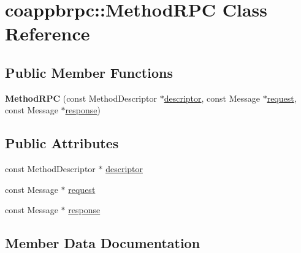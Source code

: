 \hypertarget{classcoappbrpc_1_1MethodRPC}{}\section{coappbrpc\+:\+:Method\+R\+PC Class Reference}
\label{classcoappbrpc_1_1MethodRPC}
\subsection*{Public Member Functions}
\begin{DoxyCompactItemize}
\item 
\mbox{\label{classcoappbrpc_1_1MethodRPC_a0db09113d43fcfef728b4dd261cd564a}} 
{\bfseries Method\+R\+PC} (const Method\+Descriptor $\ast$\hyperlink{classcoappbrpc_1_1MethodRPC_a7e835872e8ec2768c3c4a8af2ddc9554}{descriptor}, const Message $\ast$\hyperlink{classcoappbrpc_1_1MethodRPC_abc03c65fd8f6a540dacc0a1a7cf64695}{request}, const Message $\ast$\hyperlink{classcoappbrpc_1_1MethodRPC_abf2e75cc873ba1b4591b78f9e1955d49}{response})
\end{DoxyCompactItemize}
\subsection*{Public Attributes}
\begin{DoxyCompactItemize}
\item 
const Method\+Descriptor $\ast$ \hyperlink{classcoappbrpc_1_1MethodRPC_a7e835872e8ec2768c3c4a8af2ddc9554}{descriptor}
\item 
const Message $\ast$ \hyperlink{classcoappbrpc_1_1MethodRPC_abc03c65fd8f6a540dacc0a1a7cf64695}{request}
\item 
const Message $\ast$ \hyperlink{classcoappbrpc_1_1MethodRPC_abf2e75cc873ba1b4591b78f9e1955d49}{response}
\end{DoxyCompactItemize}


\subsection{Member Data Documentation}
\mbox{\label{classcoappbrpc_1_1MethodRPC_a7e835872e8ec2768c3c4a8af2ddc9554}} 
